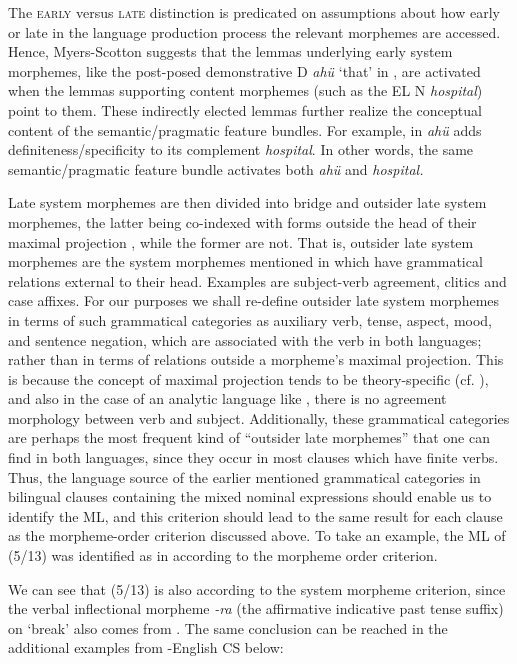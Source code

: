 \documentclass[output=paper]{langsci/langscibook}
\begin{document}
The \textsc{early} versus \textsc{late} distinction is predicated on assumptions about how early or late in the language production process the relevant morphemes are accessed. Hence, Myers-Scotton suggests that the lemmas underlying early system morphemes, like the post-posed  demonstrative D \textit{ahü} ‘that’ in , are activated when the lemmas supporting content morphemes (such as the EL N \textit{hospital}) point to them. These indirectly elected lemmas further realize the conceptual content of the semantic/pragmatic feature bundles. For example, in  \textit{ahü} adds definiteness/specificity to its complement \textit{hospital}. In other words, the same semantic/pragmatic feature bundle activates both \textit{ahü} and \textit{hospital.} 

Late system morphemes are then divided into bridge and outsider late system morphemes, the latter being co-indexed with forms outside the head of their maximal projection \citep[75]{MyersScotton2002}, while the former are not. That is, outsider late system morphemes are the system morphemes mentioned in  which have grammatical relations external to their head. Examples are subject-verb agreement, clitics and case affixes. For our purposes we shall re-define outsider late system morphemes in terms of such grammatical categories as auxiliary verb, tense, aspect, mood, and sentence negation, which are associated with the verb in both languages; rather than in terms of relations outside a morpheme’s maximal projection. This is because the concept of maximal projection tends to be theory-specific (cf. \citealt{Fukui2001}), and also in the case of an analytic language like , there is no agreement morphology between verb and subject. Additionally, these grammatical categories are perhaps the most frequent kind of “outsider late morphemes” that one can find in both languages, since they occur in most clauses which have finite verbs. Thus, the language source of the earlier mentioned grammatical categories in bilingual clauses containing the mixed nominal expressions should enable us to identify the ML, and this criterion should lead to the same result for each clause as the morpheme-order criterion discussed above. To take an example, the ML of (5/13) was identified as  in  according to the morpheme order criterion.

We can see that (5/13) is also  according to the system morpheme criterion, since the verbal inflectional morpheme \textit{-ra} (the affirmative indicative past tense suffix) on ‘break’ also comes from . The same conclusion can be reached in the additional examples from -English CS below: 
\end{document}
